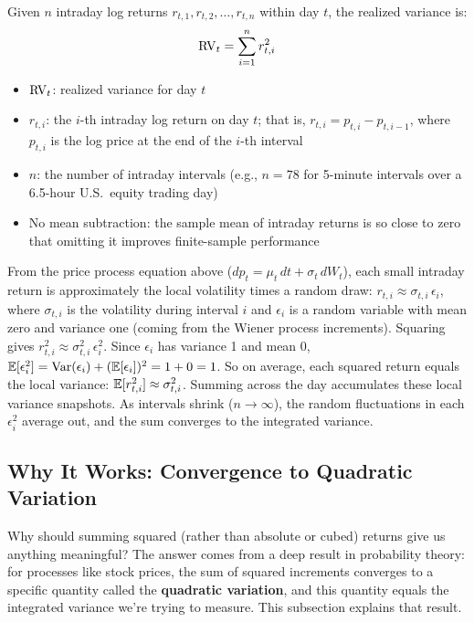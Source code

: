 \begin{definition}
Given $n$ intraday log returns $r_{t,1}, r_{t,2}, \ldots, r_{t,n}$ within day $t$, the realized variance is:
\begin{equation}
  \operatorname{RV}_t = \sum_{i=1}^{n} r^2_{t,i}
  \label{eq:rv}
\end{equation}
\begin{itemize}[nosep]
  \item $\operatorname{RV}_t$: realized variance for day $t$
  \item $r_{t,i}$: the $i$-th intraday log return on day $t$; that is, $r_{t,i} = p_{t,i} - p_{t,i-1}$, where $p_{t,i}$ is the log price at the end of the $i$-th interval
  \item $n$: the number of intraday intervals (e.g., $n = 78$ for 5-minute intervals over a 6.5-hour U.S.\ equity trading day)
  \item No mean subtraction: the sample mean of intraday returns is so close to zero that omitting it improves finite-sample performance \citep{ABDL2003}
\end{itemize}
\end{definition}

\begin{intuition}
From the price process equation above ($dp_t = \mu_t\,dt + \sigma_t\,dW_t$), each small intraday return is approximately the local volatility times a random draw: $r_{t,i} \approx \sigma_{t,i}\,\epsilon_i$, where $\sigma_{t,i}$ is the volatility during interval $i$ and $\epsilon_i$ is a random variable with mean zero and variance one (coming from the Wiener process increments).
Squaring gives $r^2_{t,i} \approx \sigma^2_{t,i}\,\epsilon^2_i$.
Since $\epsilon_i$ has variance 1 and mean 0, $\mathbb{E}[\epsilon^2_i] = \operatorname{Var}(\epsilon_i) + (\mathbb{E}[\epsilon_i])^2 = 1 + 0 = 1$.
So on average, each squared return equals the local variance: $\mathbb{E}[r^2_{t,i}] \approx \sigma^2_{t,i}$.
Summing across the day accumulates these local variance snapshots.
As intervals shrink ($n \to \infty$), the random fluctuations in each $\epsilon^2_i$ average out, and the sum converges to the integrated variance.
\end{intuition}

\subsection{Why It Works: Convergence to Quadratic Variation}

Why should summing squared (rather than absolute or cubed) returns give us anything meaningful?
The answer comes from a deep result in probability theory: for processes like stock prices, the sum of squared increments converges to a specific quantity called the \textbf{quadratic variation}, and this quantity equals the integrated variance we're trying to measure.
This subsection explains that result.

